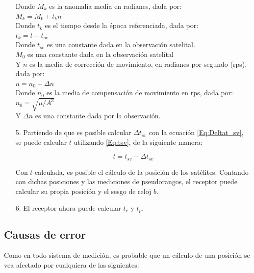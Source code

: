 \begin{itemize}
Donde $M_k$ es la anomalía media en radianes, dada por: \\

$M_k = M_0 + t_k n$\\

Donde $t_k$ es el tiempo desde la época referenciada, dada por:\\

$t_k = t - t_{oe}$\\

Donde $t_{oe}$ es una constante dada en la observación satelital.\\

$M_0$ es una constante dada en la observación satelital\\

Y $n$ es la media de corrección de movimiento, en radianes por segundo (rps), dada por:\\

$n = n_0 + \Delta n$\\

Donde $n_0$ es la media de compensación de movimiento en rps, dada por:\\

$n_0 = \sqrt{\mu / A^{3}}$\\ 

Y $\Delta n$ es una constante dada por la observación.\\

\item[5.] Partiendo de que es posible calcular $\Delta t_{sv}$ con la ecuación \ref{Eq:Deltat_sv}, se puede calcular $t$ utilizando \ref{Eq:tsv}, de la siguiente manera:

\begin{equation}
\label{t}
t = t_{sv} - \Delta t_{sv}
\end{equation}

Con $t$ calculada, es posible el cálculo de la posición de los satélites. Contando con dichas posiciones y las mediciones de pseudorangos, el receptor puede calcular su propia posición y el sesgo de reloj $b$.

\item[6.] El receptor ahora puede calcular $t_r$ y $t_p$\cite{farrell2008aided}.
\end{itemize}

\subsection{Causas de error}

Como en todo sistema de medición, es probable que un cálculo de una posición se vea afectado por cualquiera de las siguientes: 

